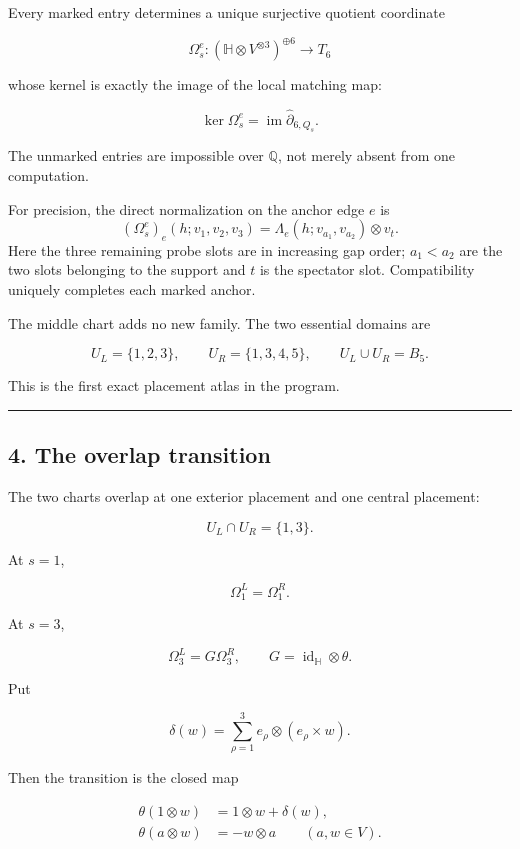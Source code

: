\documentclass[
  11pt,
  a4paper,
]{article}
\begin{document}
Every marked entry determines a unique surjective quotient coordinate

\[
\Omega_s^e:
(\mathbb H\otimes V^{\otimes3})^{\oplus6}
\longrightarrow T_6
\tag{3.5}
\]

whose kernel is exactly the image of the local matching map:

\[
\boxed{
\ker\Omega_s^e=\operatorname{im}\widehat\partial_{6,Q_s}.
}
\tag{3.6}
\]

The unmarked entries are impossible over \(\mathbb Q\), not merely
absent from one computation.

For precision, the direct normalization on the anchor edge \(e\) is \[
 (\Omega_s^e)_e(h;v_1,v_2,v_3)
 =\Lambda_e(h;v_{a_1},v_{a_2})\otimes v_t.
\] Here the three remaining probe slots are in increasing gap order;
\(a_1<a_2\) are the two slots belonging to the support and \(t\) is the
spectator slot. Compatibility uniquely completes each marked anchor.

The middle chart adds no new family. The two essential domains are

\[
\boxed{
U_L=\{1,2,3\},
\qquad
U_R=\{1,3,4,5\},
\qquad
U_L\cup U_R=B_5.
}
\tag{3.7}
\]

This is the first exact placement atlas in the program.

\begin{center}\rule{0.5\linewidth}{0.5pt}\end{center}

\hypertarget{the-overlap-transition}{%
\subsection{4. The overlap transition}\label{the-overlap-transition}}

The two charts overlap at one exterior placement and one central
placement:

\[
U_L\cap U_R=\{1,3\}.
\tag{4.1}
\]

At \(s=1\),

\[
\boxed{\Omega_1^L=\Omega_1^R.}
\tag{4.2}
\]

At \(s=3\),

\[
\boxed{
\Omega_3^L=G\Omega_3^R,
\qquad
G=\operatorname{id}_{\mathbb H}\otimes\theta.
}
\tag{4.3}
\]

Put

\[
\delta(w)=
\sum_{\rho=1}^{3}e_\rho\otimes(e_\rho\times w).
\tag{4.4}
\]

Then the transition is the closed map

\[
\boxed{
\begin{aligned}
\theta(1\otimes w)&=1\otimes w+\delta(w),\\
\theta(a\otimes w)&=-w\otimes a
\qquad(a,w\in V).
\end{aligned}}
\tag{4.5}
\]
\end{document}
